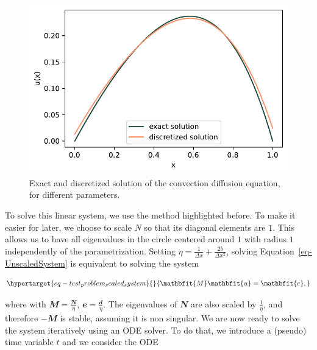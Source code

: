 \documentclass[
  letterpaper,
]{report}
\theoremstyle{plain}
\theoremstyle{definition}
\theoremstyle{definition}
\theoremstyle{remark}
\begin{document}
\begin{figure}
\begin{minipage}[t]{0.50\linewidth}
{{\includegraphics{./4_convecDiff_files/figure-pdf/fig-th_vs_dis-output-2.pdf}

}

}

\end{minipage}%

\caption{\label{fig-th_vs_dis}Exact and discretized solution of the
convection diffusion equation, for different parameters.}

\end{figure}

To solve this linear system, we use the method highlighted before. To
make it easier for later, we choose to scale \(N\) so that its diagonal
elements are \(1\). This allows us to have all eigenvalues in the circle
centered around \(1\) with radius \(1\) independently of the
parametrization. Setting
\(\eta = \frac{1}{\Delta x} + \frac{2b}{\Delta x^2}\), solving
Equation~\ref{eq-UnscaledSystem} is equivalent to solving the system

\begin{equation}\protect\hypertarget{eq-test_problem_scaled_system}{}{
\mathbfit{M} \mathbfit{u} = \mathbfit{e},
}\label{eq-test_problem_scaled_system}\end{equation}

where with \(\mathbfit{M} = \frac{\mathbfit{N}}{\eta}\),
\(\mathbfit{e} = \frac{\mathbfit{d}}{\eta}\). The eigenvalues of
\(\mathbfit{N}\) are also scaled by \(\frac{1}{\eta}\), and therefore
\(-\mathbfit{M}\) is stable, assuming it is non singular. We are now
ready to solve the system iteratively using an ODE solver. To do that,
we introduce a (pseudo) time variable \(t\) and we consider the ODE
\end{document}
